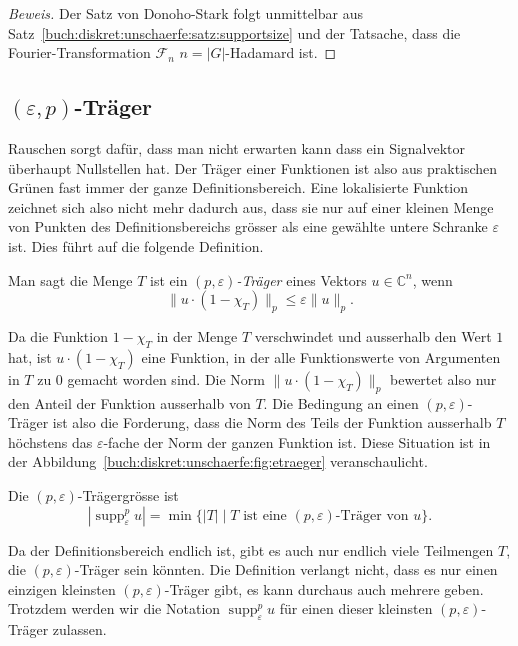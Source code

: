 \begin{proof}[Beweis]
Der Satz von Donoho-Stark folgt unmittelbar aus
Satz~\ref{buch:diskret:unschaerfe:satz:supportsize} und der
Tatsache, dass die Fourier-Transformation $\mathscr{F}_n$
$n=|G|$-Hadamard ist.
\end{proof}

%
%
\subsection{$(\varepsilon,p)$-Träger}

Rauschen sorgt dafür, dass man nicht erwarten kann dass ein
Signalvektor überhaupt Nullstellen hat.
Der Träger einer Funktionen ist also aus praktischen Grünen fast immer
der ganze Definitionsbereich.
Eine lokalisierte Funktion zeichnet sich also nicht mehr dadurch aus,
dass sie nur auf einer kleinen Menge von Punkten des Definitionsbereichs
grösser als eine gewählte untere Schranke $\varepsilon$ ist.
Dies führt auf die folgende Definition.

\begin{definition}
Man sagt die Menge $T$ ist ein {\em $(p,\varepsilon)$-Träger} eines Vektors
$u\in\mathbb{C}^n$, wenn 
\[
\| u\cdot (1-\chi_T)  \|_p \le \varepsilon \|u\|_p.
\]
%
\end{definition}

Da die Funktion $1-\chi_T$ in der Menge $T$ verschwindet und ausserhalb
den Wert $1$ hat, ist
$u\cdot (1-\chi_T)$ eine Funktion, in der alle Funktionswerte von
Argumenten in $T$ zu $0$ gemacht worden sind.
Die Norm $\| u\cdot (1-\chi_T) \|_p$ bewertet also nur den Anteil der
Funktion ausserhalb von $T$.
Die Bedingung an einen $(p,\varepsilon)$-Träger ist also die Forderung,
dass die Norm des Teils der Funktion ausserhalb $T$ höchstens das
$\varepsilon$-fache der Norm der ganzen Funktion ist.
Diese Situation ist in der Abbildung~\ref{buch:diskret:unschaerfe:fig:etraeger}
veranschaulicht.

\begin{definition}
Die $(p,\varepsilon)$-Trägergrösse ist
\[
|\operatorname{supp}_\varepsilon^p u|
=
\min \{ |T|\mid \text{$T$ ist eine $(p,\varepsilon)$-Träger von $u$}\}.
\]
\end{definition}

Da der Definitionsbereich endlich ist, gibt es auch nur endlich viele
Teilmengen $T$, die $(p,\varepsilon)$-Träger sein könnten.
Die Definition verlangt nicht, dass es nur einen einzigen kleinsten
$(p,\varepsilon)$-Träger gibt, es kann durchaus auch mehrere geben.
Trotzdem werden wir die Notation $\operatorname{supp}_\varepsilon^p u$
für einen dieser kleinsten $(p,\varepsilon)$-Träger zulassen.


